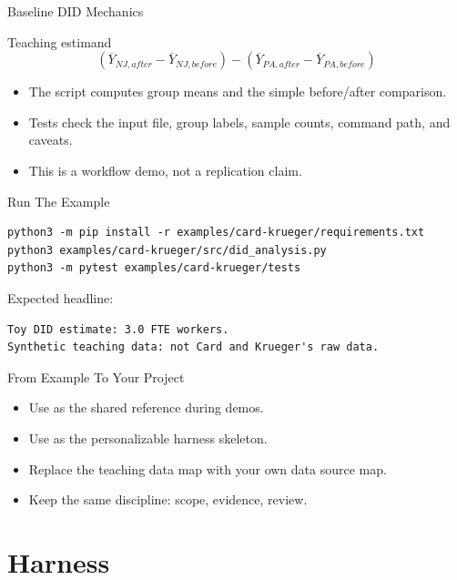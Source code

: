 \begin{frame}{Baseline DID Mechanics}
  \begin{block}{Teaching estimand}
    \[
      (\overline{Y}_{NJ,after} - \overline{Y}_{NJ,before})
      -
      (\overline{Y}_{PA,after} - \overline{Y}_{PA,before})
    \]
  \end{block}
  \begin{itemize}
    \item The script computes group means and the simple before/after comparison.
    \item Tests check the input file, group labels, sample counts, command path, and caveats.
    \item This is a workflow demo, not a replication claim.
  \end{itemize}
\end{frame}

\begin{frame}[fragile]{Run The Example}
  \begin{lstlisting}[style=bash]
python3 -m pip install -r examples/card-krueger/requirements.txt
python3 examples/card-krueger/src/did_analysis.py
python3 -m pytest examples/card-krueger/tests
  \end{lstlisting}
  \vspace{0.3em}
  Expected headline:
  \begin{lstlisting}[style=markdown]
Toy DID estimate: 3.0 FTE workers.
Synthetic teaching data: not Card and Krueger's raw data.
  \end{lstlisting}
\end{frame}

\begin{frame}{From Example To Your Project}
  \begin{itemize}
    \item Use  as the shared reference during demos.
    \item Use  as the personalizable harness skeleton.
    \item Replace the teaching data map with your own data source map.
    \item Keep the same discipline: scope, evidence, review.
  \end{itemize}
\end{frame}

\section{Harness}

